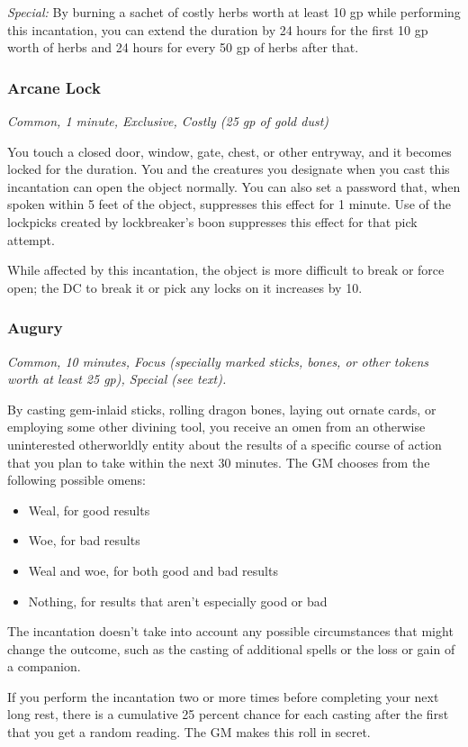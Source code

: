 \textit{Special:} By burning a sachet of costly herbs worth at least 10 gp while performing this incantation, you can extend the duration by 24 hours for the first 10 gp worth of herbs and 24 hours for every 50 gp of herbs after that.

\subsubsection{Arcane Lock}
\textit{Common, 1 minute, Exclusive, Costly (25 gp of gold dust)}

You touch a closed door, window, gate, chest, or other entryway, and it becomes locked for the duration. You and the creatures you designate when you cast this incantation can open the object normally. You can also set a password that, when spoken within 5 feet of the object, suppresses this effect for 1 minute. Use of the lockpicks created by lockbreaker's boon suppresses this effect for that pick attempt.

While affected by this incantation, the object is more difficult to break or force open; the DC to break it or pick any locks on it increases by 10.

\subsubsection{Augury}
\textit{Common, 10 minutes, Focus (specially marked sticks, bones, or other tokens worth at least 25 gp), Special (see text).}

By casting gem-inlaid sticks, rolling dragon bones, laying out ornate cards, or employing some other divining tool, you receive an omen from an otherwise uninterested otherworldly entity about the results of a specific course of action that you plan to take within the next 30 minutes. The GM chooses from the following possible omens:
\begin{itemize}
\item Weal, for good results
\item Woe, for bad results
\item Weal and woe, for both good and bad results
\item Nothing, for results that aren't especially good or bad
\end{itemize}

The incantation doesn't take into account any possible circumstances that might change the outcome, such as the casting of additional spells or the loss or gain of a companion.

If you perform the incantation two or more times before completing your next long rest, there is a cumulative 25 percent chance for each casting after the first that you get a random reading. The GM makes this roll in secret.

